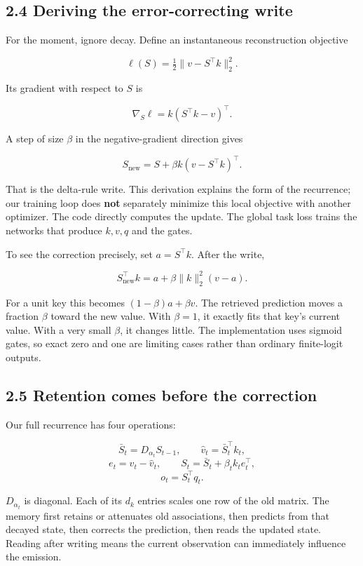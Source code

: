\documentclass[
  11pt,
]{article}
\let\oldsubsection\subsection
\renewcommand{\subsection}{\Needspace{6\baselineskip}\oldsubsection}
\begin{document}
\subsection{2.4 Deriving the error-correcting
write}\label{deriving-the-error-correcting-write}

For the moment, ignore decay. Define an instantaneous reconstruction
objective

\[\ell(S)=\tfrac12\|v-S^\top k\|_2^2.\]

Its gradient with respect to \(S\) is

\[\nabla_S\ell=k(S^\top k-v)^\top.\]

A step of size \(\beta\) in the negative-gradient direction gives

\[S_{\mathrm{new}}=S+\beta k(v-S^\top k)^\top.\]

That is the delta-rule write. This derivation explains the form of the
recurrence; our training loop does \textbf{not} separately minimize this
local objective with another optimizer. The code directly computes the
update. The global task loss trains the networks that produce \(k,v,q\)
and the gates.

To see the correction precisely, set \(a=S^\top k\). After the write,

\[S_{\mathrm{new}}^\top k=a+\beta\|k\|_2^2(v-a).\]

For a unit key this becomes \((1-\beta)a+\beta v\). The retrieved
prediction moves a fraction \(\beta\) toward the new value. With
\(\beta=1\), it exactly fits that key's current value. With a very small
\(\beta\), it changes little. The implementation uses sigmoid gates, so
exact zero and one are limiting cases rather than ordinary finite-logit
outputs.

\subsection{2.5 Retention comes before the
correction}\label{retention-comes-before-the-correction}

Our full recurrence has four operations:

\[\bar S_t=D_{\alpha_t}S_{t-1},\qquad
\hat v_t=\bar S_t^\top k_t,\] \[e_t=v_t-\hat v_t,\qquad
S_t=\bar S_t+\beta_t k_t e_t^\top,\] \[o_t=S_t^\top q_t.\]

\(D_{\alpha_t}\) is diagonal. Each of its \(d_k\) entries scales one row
of the old matrix. The memory first retains or attenuates old
associations, then predicts from that decayed state, then corrects the
prediction, then reads the updated state. Reading after writing means
the current observation can immediately influence the emission.
\end{document}
